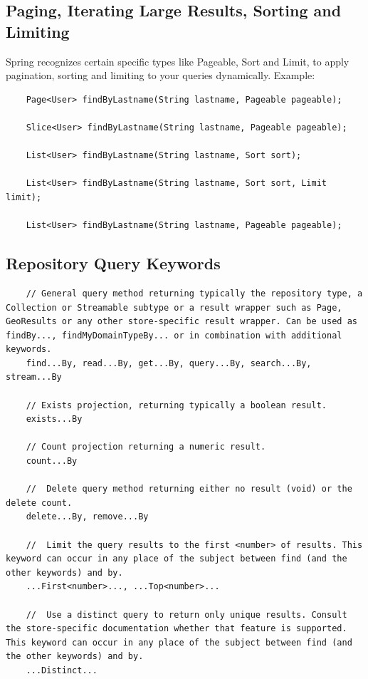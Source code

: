 \documentclass{scrartcl}
\begin{document}
\subsection{Paging, Iterating Large Results, Sorting and Limiting}

    Spring recognizes certain specific types like Pageable, Sort and Limit, to apply pagination, sorting and limiting to your queries dynamically.
    Example:

\begin{lstlisting}
    Page<User> findByLastname(String lastname, Pageable pageable);

    Slice<User> findByLastname(String lastname, Pageable pageable);

    List<User> findByLastname(String lastname, Sort sort);

    List<User> findByLastname(String lastname, Sort sort, Limit limit);

    List<User> findByLastname(String lastname, Pageable pageable);
\end{lstlisting}

\subsection{Repository Query Keywords}

\begin{lstlisting}
    // General query method returning typically the repository type, a Collection or Streamable subtype or a result wrapper such as Page, GeoResults or any other store-specific result wrapper. Can be used as findBy..., findMyDomainTypeBy... or in combination with additional keywords.
    find...By, read...By, get...By, query...By, search...By, stream...By

    // Exists projection, returning typically a boolean result.
    exists...By

    // Count projection returning a numeric result.
    count...By

    //  Delete query method returning either no result (void) or the delete count.
    delete...By, remove...By

    //  Limit the query results to the first <number> of results. This keyword can occur in any place of the subject between find (and the other keywords) and by.
    ...First<number>..., ...Top<number>...

    //  Use a distinct query to return only unique results. Consult the store-specific documentation whether that feature is supported. This keyword can occur in any place of the subject between find (and the other keywords) and by.
    ...Distinct...
\end{lstlisting}
\end{document}
